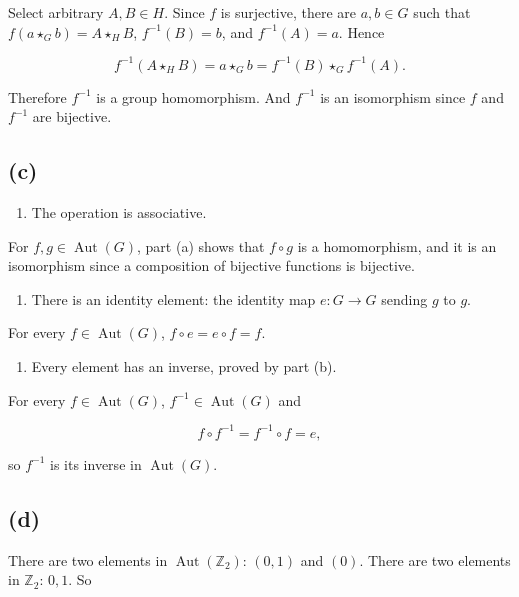 Select arbitrary \(A,B \in H\). Since \(f\) is surjective, there are \(a,b \in G\) such that \(f\left( {a \star_{G}b} \right) = A \star_{H}B\), \(f^{- 1}(B) = b\), and \(f^{- 1}(A) = a\). Hence

\[f^{- 1}\left( {A \star_{H}B} \right) = a \star_{G}b = f^{- 1}(B) \star_{G}f^{- 1}(A).\]

Therefore \(f^{- 1}\) is a group homomorphism. And \(f^{- 1}\) is an isomorphism since \(f\) and \(f^{- 1}\) are bijective.

\subsection{(c)}

\begin{enumerate}
\tightlist
\item
  The operation is associative.
\end{enumerate}

For \(f,g \in \operatorname{Aut}(G)\), part (a) shows that \(f \circ g\) is a homomorphism, and it is an isomorphism since a composition of bijective functions is bijective.

\begin{enumerate}
\tightlist
\item
  There is an identity element: the identity map \(e:G\rightarrow G\) sending \(g\) to \(g\).
\end{enumerate}

For every \(f \in \operatorname{Aut}(G)\), \(f \circ e = e \circ f = f\).

\begin{enumerate}
\tightlist
\item
  Every element has an inverse, proved by part (b).
\end{enumerate}

For every \(f \in \operatorname{Aut}(G)\), \(f^{- 1} \in \operatorname{Aut}(G)\) and

\[f \circ f^{- 1} = f^{- 1} \circ f = e,\]

so \(f^{- 1}\) is its inverse in \(\operatorname{Aut}(G)\).

\subsection{(d)}

There are two elements in \(\operatorname{Aut}\left( \mathbb{Z}_{2} \right)\): \(\left( {0,1} \right)\) and \((0)\). There are two elements in \(\mathbb{Z}_{2}\): \(0,1\). So

